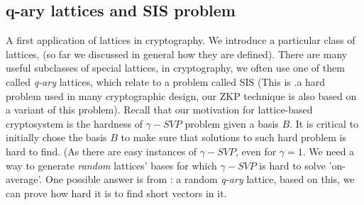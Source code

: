 \subsection{q-ary lattices and SIS problem}
\label{sub:q-ary lattices and SIS problem}
A first application of lattices in cryptography. We introduce a particular class
of lattices, (so far we discussed in general how they are defined). There are
many useful subclasses of special lattices, in cryptography, we often use one of
them called \emph{q-ary} lattices, which relate to a problem called SIS (This is
    .a hard problem used in many cryptographic design, our ZKP technique is also
based on a variant of this problem). Recall that our motivation for
lattice-based cryptosystem is the hardness of $\gamma-SVP$ problem given a
basis $B$. It is critical to initially chose the basis $B$ to make sure that
solutions to such hard problem is hard to find. (As there are easy instances of
    $\gamma-SVP$, even for $\gamma=1$. We need a way to generate \emph{random}
    lattices' bases for which $\gamma-SVP$ is hard to solve 'on-average'. One
    possible answer is from \cite{ajtai1996generating}: a random \emph{q-ary} lattice, based
    on this, we can prove how hard it is to find short vectors in it.
